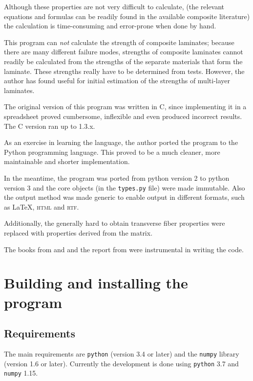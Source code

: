 \documentclass[a4paper,landscape,oneside,11pt,twocolumn]{memoir}
\begin{document}
Although these properties are not very difficult to calculate, (the relevant
equations and formulas can be readily found in the available composite
literature) the calculation is time-consuming and error-prone when done by
hand.

This program can \emph{not} calculate the strength of composite laminates;
because there are many different failure modes, strengths of composite
laminates cannot readily be calculated from the strengths of the separate
materials that form the laminate. These strengths really have to be determined from
tests. However, the author has found \citet{1992WeiEn..52...29H} useful for
initial estimation of the strengths of multi-layer laminates.

The original version of this program was written in C, since implementing
it in a spreadsheet proved cumbersome, inflexible and even produced
incorrect results. The C version ran up to 1.3.x.

As an exercise in learning the language, the author ported the program to
the Python programming language. This proved to be a much cleaner, more
maintainable and shorter implementation.

In the meantime, the program was ported from python version 2 to python
version 3 and the core objects (in the \texttt{types.py} file) were made
immutable. Also the output method was made generic to enable output in
different formats, such as \LaTeX, \textsc{html} and \textsc{rtf}.

Additionally, the generally hard to obtain transverse fiber properties
were replaced with properties derived from the matrix.

The books from \citet{Hyer:1998} and \citet{Tsai:1992} and the report from
\citet{Nettles:1994} were instrumental in writing the code.


\chapter{Building and installing the program} %

\section{Requirements} %

The main requirements are \texttt{python} (version 3.4 or later) and the
\texttt{numpy} library (version 1.6 or later). Currently the development is
done using \texttt{python} 3.7 and \texttt{numpy} 1.15.
\end{document}
